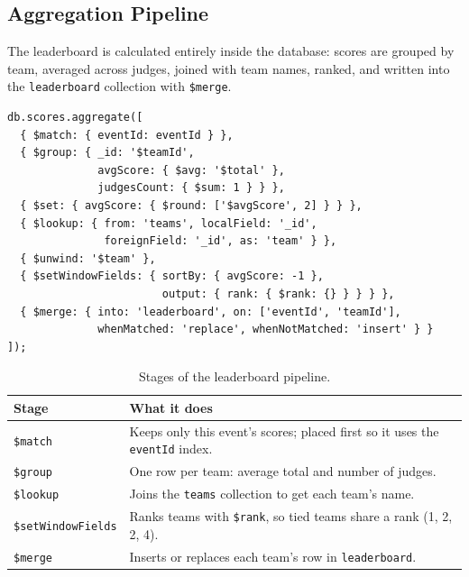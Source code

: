 \documentclass[11pt,a4paper]{article}
\begin{document}
\subsection{Aggregation Pipeline}
The leaderboard is calculated entirely inside the database: scores are grouped by team, averaged across judges, joined with team names, ranked, and written into the \texttt{leaderboard} collection with \texttt{\$merge}.
\begin{lstlisting}
db.scores.aggregate([
  { $match: { eventId: eventId } },
  { $group: { _id: '$teamId',
              avgScore: { $avg: '$total' },
              judgesCount: { $sum: 1 } } },
  { $set: { avgScore: { $round: ['$avgScore', 2] } } },
  { $lookup: { from: 'teams', localField: '_id',
               foreignField: '_id', as: 'team' } },
  { $unwind: '$team' },
  { $setWindowFields: { sortBy: { avgScore: -1 },
                        output: { rank: { $rank: {} } } } },
  { $merge: { into: 'leaderboard', on: ['eventId', 'teamId'],
              whenMatched: 'replace', whenNotMatched: 'insert' } }
]);
\end{lstlisting}

\begin{table}[H]
\centering
\begin{tabularx}{\textwidth}{l X}
\toprule
\textbf{Stage} & \textbf{What it does} \\
\midrule
\texttt{\$match}           & Keeps only this event's scores; placed first so it uses the \texttt{eventId} index. \\
\texttt{\$group}           & One row per team: average total and number of judges. \\
\texttt{\$lookup}          & Joins the \texttt{teams} collection to get each team's name. \\
\texttt{\$setWindowFields} & Ranks teams with \texttt{\$rank}, so tied teams share a rank (1, 2, 2, 4). \\
\texttt{\$merge}           & Inserts or replaces each team's row in \texttt{leaderboard}. \\
\bottomrule
\end{tabularx}
\caption{Stages of the leaderboard pipeline.}
\end{table}
\end{document}
